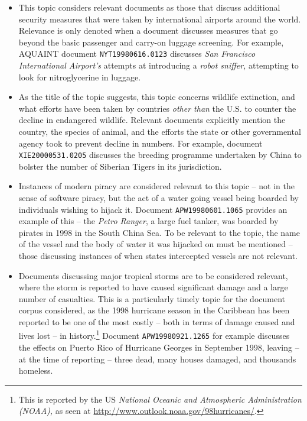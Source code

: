 \begin{itemize}
    
    \item{ This topic considers relevant documents as those that discuss additional security measures that were taken by international airports around the world. Relevance is only denoted when a document discusses measures that go beyond the basic passenger and carry-on luggage screening. For example, AQUAINT document \texttt{NYT19980616.0123} discusses \emph{San Francisco International Airport's} attempts at introducing a \emph{robot sniffer,} attempting to look for nitroglycerine in luggage.}
    
    \item{ As the title of the topic suggests, this topic concerns wildlife extinction, and what efforts have been taken by countries \emph{other than} the U.S. to counter the decline in endangered wildlife. Relevant documents explicitly mention the country, the species of animal, and the efforts the state or other governmental agency took to prevent decline in numbers. For example, document \texttt{XIE20000531.0205} discusses the breeding programme undertaken by China to bolster the number of Siberian Tigers in its jurisdiction.}
    
    \item{ Instances of modern piracy are considered relevant to this topic -- not in the sense of software piracy, but the act of a water going vessel being boarded by individuals wishing to hijack it. Document \texttt{APW19980601.1065} provides an example of this -- the \emph{Petro Ranger}, a large fuel tanker, was boarded by pirates in 1998 in the South China Sea. To be relevant to the topic, the name of the vessel and the body of water it was hijacked on must be mentioned -- those discussing instances of when states intercepted vessels are not relevant.}
    
    \item{ Documents discussing major tropical storms are to be considered relevant, where the storm is reported to have caused significant damage and a large number of casualties. This is a particularly timely topic for the document corpus considered, as the 1998 hurricane season in the Caribbean has been reported to be one of the most costly -- both in terms of damage caused and lives lost -- in history.\footnote{This is reported by the US \emph{National Oceanic and Atmospheric Administration (NOAA),} as seen at \url{http://www.outlook.noaa.gov/98hurricanes/}. } Document \texttt{APW19980921.1265} for example discusses the effects on Puerto Rico of Hurricane Georges in September 1998, leaving -- at the time of reporting -- three dead, many houses damaged, and thousands homeless.}
    

\end{itemize}
